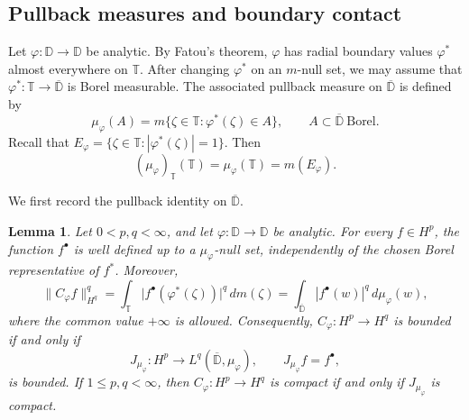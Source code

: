 \documentclass[11pt, reqno]{amsart}
\newtheorem{lemma}[theorem]{Lemma}
\theoremstyle{definition}
\theoremstyle{remark}
\newcommand{\D}{\mathbb{D}}
\newcommand{\T}{\mathbb{T}}
\begin{document}
\subsection{Pullback measures and boundary contact}
\label{subsec:pullback}

Let \(\varphi:\D\to\D\) be analytic. By Fatou's theorem,
\(\varphi\) has radial boundary values \(\varphi^*\) almost everywhere
on \(\T\). After changing \(\varphi^*\) on an \(m\)-null set, we may
assume that
\(
        \varphi^*:\T\longrightarrow\overline{\D}
\)
is Borel measurable. The associated pullback measure on
\(\overline{\D}\) is defined by
\[
        \mu_\varphi(A)
        =
        m\{\zeta\in\T:\varphi^*(\zeta)\in A\},
        \qquad
        A\subset\overline{\D}\ \text{Borel}.
\]
Recall that
\(E_\varphi=\{\zeta\in\T:|\varphi^*(\zeta)|=1\}\). Then
\begin{equation}
\label{eq:boundary-mass}
        (\mu_\varphi)_\T(\T)
        =
        \mu_\varphi(\T)
        =
        m(E_\varphi).
\end{equation}

We first record the pullback identity on \(\overline{\D}\).

\begin{lemma}
\label{lem:pullback-id}
Let \(0<p,q<\infty\), and let \(\varphi:\D\to\D\) be analytic. For
every \(f\in H^p\), the function \(f^\bullet\) is well defined up to a
\(\mu_\varphi\)-null set, independently of the chosen Borel
representative of \(f^*\). Moreover,
\[
        \|C_\varphi f\|_{H^q}^q
        =
        \int_\T
        \bigl|f^\bullet(\varphi^*(\zeta))\bigr|^q\,dm(\zeta)
        =
        \int_{\overline{\D}}
        |f^\bullet(w)|^q\,d\mu_\varphi(w),
\]
where the common value \(+\infty\) is allowed. Consequently,
\(C_\varphi:H^p\to H^q\) is bounded if and only if
\[
        J_{\mu_\varphi}:H^p
        \longrightarrow
        L^q(\overline{\D},\mu_\varphi),
        \qquad
        J_{\mu_\varphi}f=f^\bullet,
\]
is bounded. If \(1\le p,q<\infty\), then
\(C_\varphi:H^p\to H^q\) is compact if and only if
\(J_{\mu_\varphi}\) is compact.
\end{lemma}
\end{document}
